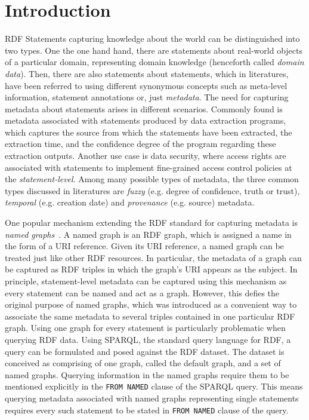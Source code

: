\section{Introduction}
RDF Statements capturing knowledge about the world can be distinguished into two types. One the one hand hand, there are statements about real-world objects of a particular domain, representing domain knowledge (henceforth called \emph{domain data}). Then, there are also statements about statements, which in literatures, have been referred to using different synonymous concepts such as meta-level information, statement annotations or, just \emph{metadata}. The need for capturing metadata about statements arises in different scenarios. Commonly found is metadata associated with statements produced by data extraction programs, which captures the source from which the statements have been extracted, the extraction time, and the confidence degree of the program regarding these extraction outputs. Another use case is data security, where access rights are associated with statements to implement fine-grained access control policies at the \emph{statement-level}. Among many possible types of metadata, the three common types discussed in literatures are \emph{fuzzy} (e.g. degree of confidence, truth or trust), \emph{temporal} (e.g. creation date) and \emph{provenance} (e.g. source) metadata. 

One popular mechanism extending the RDF standard for capturing metadata is \emph{named graphs}~\cite{DBLP:journals/ws/CarrollBHS05}. A named graph is an RDF graph, which is assigned
a name in the form of a URI reference. Given its URI reference, a named graph can be treated just like other RDF resources. In particular, the metadata of a graph can be captured as RDF triples in which the graph's URI appears as the subject. In principle, statement-level metadata can be captured using this mechanism as every statement can be named and act as a graph. However, this defies the original purpose of named graphs, which was introduced as a convenient way to associate the same metadata to several triples contained in one particular RDF graph. Using one graph for every statement is particularly problematic when querying RDF data. Using SPARQL, the standard query language for RDF, a query can be formulated and posed against the RDF dataset. The dataset is conceived as comprising of one graph, called the default graph, and a set of named graphs. Querying information in the named graphs require them to be mentioned explicitly in the \verb+FROM NAMED+ clause of the SPARQL query. This means querying metadata associated with named graphs representing single statements requires every such statement to be stated in \verb+FROM NAMED+ clause of the query.

